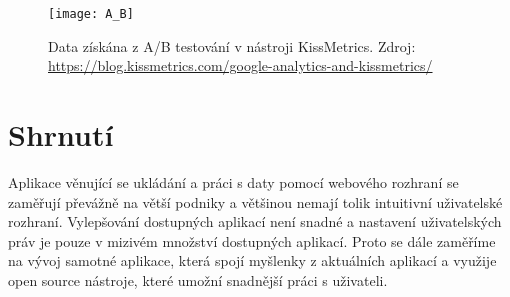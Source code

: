 \begin{figure}[htp]
\centering
\texttt{[image: A\_B]}
\caption[Data získána z A/B testování v nástroji KissMetrics]{Data získána z A/B testování v nástroji KissMetrics. Zdroj: \url{https://blog.kissmetrics.com/google-analytics-and-kissmetrics/}}
\label{ab-fig}
\end{figure}

\section{Shrnutí}
\par Aplikace věnující se ukládání a práci s daty pomocí webového rozhraní se zaměřují převážně na větší podniky a většinou nemají tolik intuitivní uživatelské rozhraní. Vylepšování dostupných aplikací není snadné a nastavení uživatelských práv je pouze v mizivém množství dostupných aplikací. Proto se dále zaměříme na vývoj samotné aplikace, která spojí myšlenky z aktuálních aplikací a využije open source nástroje, které umožní snadnější práci s uživateli.
